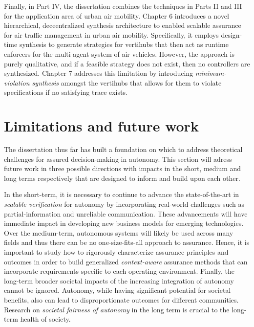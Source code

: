 Finally, in Part IV, the dissertation combines the techniques in Parts II and III for the application area of urban air mobility. Chapter 6 introduces a novel hierarchical, deceentralized synthesis architecture to enabled scalable assurance for air traffic management in urban air mobility. Specifically, it employs design-time synthesis to generate strategies for vertihubs that then act as runtime enforcers for the multi-agent system of air vehicles. However, the approach is purely qualitative, and if a feasible strategy does not exist, then no controllers are synthesized. Chapter 7 addresses this limitation by introducing \emph{minimum-violation synthesis} amongst the vertihubs that allows for them to violate specifications if no satisfying trace exists. 

\section{Limitations and future work}
The dissertation thus far has  built a foundation on which to address theoretical challenges for assured decision-making in autonomy. This section will adress future work in three possible directions with impacts in the short, medium and long terms respectively that are designed to inform and build upon each other. 

In the short-term, it is necessary to continue to advance the state-of-the-art in \emph{scalable verification} for autonomy by incorporating real-world challenges such as partial-information and unreliable communication. These advancements will have immediate impact in developing new business models for emerging technologies. Over the medium-term, autonomous systems will likely be used across many fields and thus there can be no one-size-fits-all approach to assurance.  Hence, it is important to study how to rigorously characterize assurance principles and outcomes in order to build generalized \emph{context-aware} assurance methods that can incorporate requirements specific to each operating environment. Finally, the long-term broader societal impacts of the increasing integration of autonomy cannot be ignored. Autonomy, while having significant potential for societal benefits, also can lead to disproportionate outcomes for different communities. Research on \emph{societal fairness of autonomy} in the long term is crucial to the long-term health of society.

